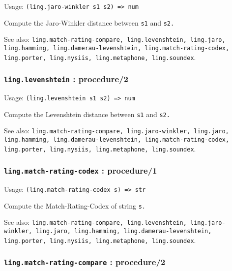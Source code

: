 \documentclass[
]{article}
\newcommand{\passthrough}[1]{#1}
\begin{document}
Usage: \passthrough{\lstinline!(ling.jaro-winkler s1 s2) => num!}

Compute the Jaro-Winkler distance between \passthrough{\lstinline!s1!}
and \passthrough{\lstinline!s2.!}

See also:
\passthrough{\lstinline!ling.match-rating-compare, ling.levenshtein, ling.jaro, ling.hamming, ling.damerau-levenshtein, ling.match-rating-codex, ling.porter, ling.nysiis, ling.metaphone, ling.soundex!}.

\hypertarget{ling.levenshtein-procedure2}{%
\subsubsection{\texorpdfstring{\texttt{ling.levenshtein} :
procedure/2}{ling.levenshtein : procedure/2}}\label{ling.levenshtein-procedure2}}

Usage: \passthrough{\lstinline!(ling.levenshtein s1 s2) => num!}

Compute the Levenshtein distance between \passthrough{\lstinline!s1!}
and \passthrough{\lstinline!s2.!}

See also:
\passthrough{\lstinline!ling.match-rating-compare, ling.jaro-winkler, ling.jaro, ling.hamming, ling.damerau-levenshtein, ling.match-rating-codex, ling.porter, ling.nysiis, ling.metaphone, ling.soundex!}.

\hypertarget{ling.match-rating-codex-procedure1}{%
\subsubsection{\texorpdfstring{\texttt{ling.match-rating-codex} :
procedure/1}{ling.match-rating-codex : procedure/1}}\label{ling.match-rating-codex-procedure1}}

Usage: \passthrough{\lstinline!(ling.match-rating-codex s) => str!}

Compute the Match-Rating-Codex of string \passthrough{\lstinline!s.!}

See also:
\passthrough{\lstinline!ling.match-rating-compare, ling.levenshtein, ling.jaro-winkler, ling.jaro, ling.hamming, ling.damerau-levenshtein, ling.porter, ling.nysiis, ling.metaphone, ling.soundex!}.

\hypertarget{ling.match-rating-compare-procedure2}{%
\subsubsection{\texorpdfstring{\texttt{ling.match-rating-compare} :
procedure/2}{ling.match-rating-compare : procedure/2}}\label{ling.match-rating-compare-procedure2}}
\end{document}
